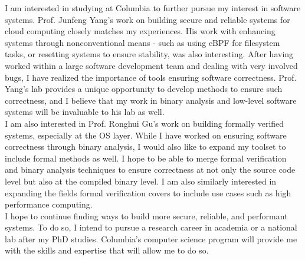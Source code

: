 \documentclass[11pt]{article}
\begin{document}
I am interested in studying at Columbia to further pursue my interest in software systems. Prof. Junfeng Yang’s work on building secure and reliable systems for cloud computing closely matches my experiences. His work with enhancing systems through nonconventional means - such as using eBPF for filesystem tasks, or resetting systems to ensure stability, was also interesting. After having worked within a large software development team and dealing with very involved bugs, I have realized the importance of tools ensuring software correctness. Prof. Yang’s lab provides a unique opportunity to develop methods to ensure such correctness, and I believe that my work in binary analysis and low-level software systems will be invaluable to his lab as well.
\\

I am also interested in Prof. Ronghui Gu’s work on building formally verified systems, especially at the OS layer. While I have worked on ensuring software correctness through binary analysis, I would also like to expand my toolset to include formal methods as well. I hope to be able to merge formal verification and binary analysis techniques to ensure correctness at not only the source code level but also at the compiled binary level. I am also similarly interested in expanding the fields formal verification covers to include use cases such as high performance computing.
\\

I hope to continue finding ways to build more secure, reliable, and performant systems. To do so, I intend to pursue a research career in academia or a national lab after my PhD studies. Columbia's computer science program will provide me with the skills and expertise that will allow me to do so.
\\
\end{document}
